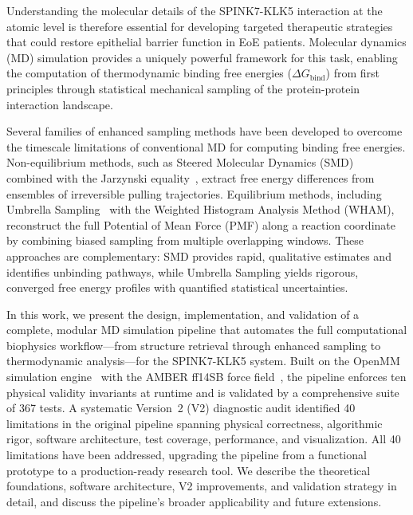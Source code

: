 \documentclass[conference]{IEEEtran}
\begin{document}
Understanding the molecular details of the SPINK7-KLK5 interaction at the
atomic level is therefore essential for developing targeted therapeutic
strategies that could restore epithelial barrier function in EoE patients.
Molecular dynamics (MD) simulation provides a uniquely powerful framework
for this task, enabling the computation of thermodynamic binding free
energies ($\Delta G_{\mathrm{bind}}$) from first principles through
statistical mechanical sampling of the protein-protein interaction
landscape.

Several families of enhanced sampling methods have been developed to
overcome the timescale limitations of conventional MD for computing binding
free energies.  Non-equilibrium methods, such as Steered Molecular Dynamics
(SMD)~\cite{izrailev1999} combined with the Jarzynski
equality~\cite{jarzynski1997}, extract free energy differences from
ensembles of irreversible pulling trajectories.  Equilibrium methods,
including Umbrella Sampling~\cite{kumar1992} with the Weighted Histogram
Analysis Method (WHAM), reconstruct the full Potential of Mean Force (PMF)
along a reaction coordinate by combining biased sampling from multiple
overlapping windows.  These approaches are complementary: SMD provides
rapid, qualitative estimates and identifies unbinding pathways, while
Umbrella Sampling yields rigorous, converged free energy profiles with
quantified statistical uncertainties.

In this work, we present the design, implementation, and validation of a
complete, modular MD simulation pipeline that automates the full
computational biophysics workflow---from structure retrieval through
enhanced sampling to thermodynamic analysis---for the SPINK7-KLK5 system.
Built on the OpenMM simulation engine~\cite{eastman2024} with the AMBER
ff14SB force field~\cite{maier2015}, the pipeline enforces ten physical
validity invariants at runtime and is validated by a comprehensive suite of
367 tests.  A systematic Version~2 (V2) diagnostic audit identified 40
limitations in the original pipeline spanning physical correctness,
algorithmic rigor, software architecture, test coverage, performance, and
visualization.  All 40 limitations have been addressed, upgrading the
pipeline from a functional prototype to a production-ready research tool.
We describe the theoretical foundations, software architecture, V2
improvements, and validation strategy in detail, and discuss the pipeline's
broader applicability and future extensions.

\end{document}
